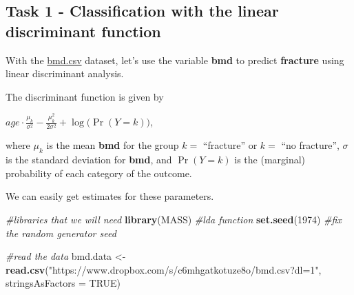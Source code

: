 \documentclass[
]{book}
\newenvironment{Shaded}{\begin{snugshade}}{\end{snugshade}}
\newcommand{\AttributeTok}[1]{\textcolor[rgb]{0.13,0.29,0.53}{#1}}
\newcommand{\CommentTok}[1]{\textcolor[rgb]{0.56,0.35,0.01}{\textit{#1}}}
\newcommand{\ConstantTok}[1]{\textcolor[rgb]{0.56,0.35,0.01}{#1}}
\newcommand{\DecValTok}[1]{\textcolor[rgb]{0.00,0.00,0.81}{#1}}
\newcommand{\FunctionTok}[1]{\textcolor[rgb]{0.13,0.29,0.53}{\textbf{#1}}}
\newcommand{\NormalTok}[1]{#1}
\newcommand{\OtherTok}[1]{\textcolor[rgb]{0.56,0.35,0.01}{#1}}
\newcommand{\StringTok}[1]{\textcolor[rgb]{0.31,0.60,0.02}{#1}}
\begin{document}
\subsection*{Task 1 - Classification with the linear discriminant function}\label{task-1---classification-with-the-linear-discriminant-function}

With the \href{https://www.dropbox.com/s/7wjsfdaf0wt2kg2/bmd.csv?dl=1}{bmd.csv}
dataset, let's use the variable \textbf{bmd} to predict \textbf{fracture} using linear
discriminant analysis.

The discriminant function is given by

\(age \cdot \frac{\mu_k}{\sigma^2} - \frac{\mu_k^2}{2\sigma^2} + \log\big(\Pr(Y=k)\big)\),

where \(\mu_k\) is the mean \textbf{bmd} for the group \(k=\) ``fracture'' or \(k=\)
``no fracture'', \(\sigma\) is the standard deviation for \textbf{bmd}, and \(\Pr(Y=k)\) is
the (marginal) probability of each category of the outcome.

We can easily get estimates for these parameters.

\begin{Shaded}
\begin{Highlighting}[]
\CommentTok{\#libraries that we will need}
\FunctionTok{library}\NormalTok{(MASS) }\CommentTok{\#lda function}
\FunctionTok{set.seed}\NormalTok{(}\DecValTok{1974}\NormalTok{) }\CommentTok{\#fix the random generator seed }

\CommentTok{\#read the data}
\NormalTok{bmd.data     }\OtherTok{\textless{}{-}} 
  \FunctionTok{read.csv}\NormalTok{(}\StringTok{"https://www.dropbox.com/s/c6mhgatkotuze8o/bmd.csv?dl=1"}\NormalTok{, }
           \AttributeTok{stringsAsFactors =} \ConstantTok{TRUE}\NormalTok{)}
\end{Highlighting}
\end{Shaded}
\end{document}
